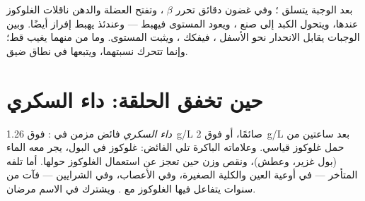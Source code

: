 \begin{example}\label{ex:g12:glucose-and-diabetes:loop}
بعد الوجبة يتسلق ؛ وفي غضون دقائق تحرر  $\beta$
، وتفتح  العضلة والدهن ناقلات الغلوكوز عندها، ويتحول
الكبد إلى صنع ، ويعود المستوى فيهبط --- وعندئذ يهبط إفراز
 أيضًا. وبين الوجبات يقابل الانحدار نحو الأسفل ،
فيفكك ، ويثبت المستوى. وما من  منهما يغيب قط؛ وإنما
تتحرك نسبتهما، ويتبعها  في نطاق ضيق.
\end{example}

\section{حين تخفق الحلقة: داء السكري}

\begin{definition}\label{def:g12:glucose-and-diabetes:diabetes}
\emph{داء السكري} فائض مزمن في : فوق
\qty{1.26}{g/L} صائمًا، أو فوق \qty{2}{g/L} بعد ساعتين من حمل غلوكوز
قياسي. وعلاماته الباكرة تلي الفائض: غلوكوز في البول، يجر معه الماء
(بول غزير، وعطش)، ونقص وزن حين تعجز  عن استعمال الغلوكوز
حولها. أما تلفه المتأخر --- في أوعية العين والكلية الصغيرة، وفي
الأعصاب، وفي الشرايين --- فآت من سنوات يتفاعل فيها الغلوكوز مع
. ويشترك في الاسم مرضان.
\end{definition}


